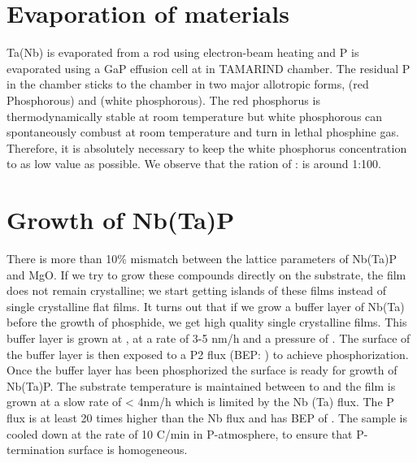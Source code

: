 \section{Evaporation of materials}

Ta(Nb) is evaporated from a rod using electron-beam heating and P is evaporated using a 
GaP effusion cell at in TAMARIND chamber. The residual P in the chamber sticks to 
the chamber in two major allotropic forms, \ptwo (red Phosphorous) and \pfour (white 
phosphorous). The red phosphorus is thermodynamically stable at room temperature but 
white phosphorous can spontaneously combust at room temperature and turn in lethal phosphine 
\phosphine gas. Therefore, it is absolutely necessary to keep the white phosphorus
concentration to as low value as possible. We observe that the ration of 
\ptwo : \pfour is around 1:100.

\section{Growth of Nb(Ta)P}


There is more than 10\% mismatch between the lattice parameters of Nb(Ta)P and MgO.
If we try to grow these compounds directly on the substrate, the film does not remain 
crystalline; we start getting islands of these films instead of single crystalline flat 
films.  It turns out that if we grow a buffer layer of Nb(Ta) before the growth of 
phosphide, we get high quality single crystalline films. This buffer layer is grown at 
, at a rate of 3-5 nm/h and a pressure of . The surface 
of the buffer layer is then exposed to a P2 flux (BEP: ) to achieve phosphorization.
Once the buffer layer has been phosphorized the surface is ready for growth of Nb(Ta)P. 
The substrate temperature is maintained between  to  and the film is grown at a 
slow rate of < 4nm/h which is limited by the Nb (Ta) flux. The P flux is at least 20 times 
higher than the Nb flux and has BEP of . The sample is cooled down at the rate of 
10 \degree C/min in P-atmosphere, to ensure that P-termination surface is homogeneous. 


